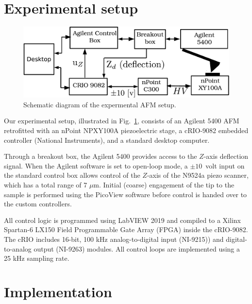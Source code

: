 \documentclass[journal]{IEEEtran}
\begin{document}
\section{Experimental setup} \label{sec:experimentalSetup}
\begin{figure}[ht!]
  \includegraphics[width=1\columnwidth]{figures/exp_setup.pdf}
  \caption{Schematic diagram of the expermental AFM setup.}
  \label{fig:exp_setup}
\end{figure}

Our experimental setup, illustrated in Fig.~\ref{fig:exp_setup},
consists of an Agilent 5400 AFM retrofitted with an nPoint NPXY100A
piezoelectric stage, a cRIO-9082 embedded controller (National
Instruments), and a standard desktop computer.

Through a breakout box, the Agilent 5400 provides access to the
$Z$-axis deflection signal. When the Agilent software is set to
open-loop mode, a $\pm10$~volt input on the standard control box
allows control of the $Z$-axis of the N9524a piezo scanner, which has
a total range of 7 $\mu$m. Initial (coarse) engagement of the tip to
the sample is performed using the PicoView software before control is
handed over to the custom controllers.
	
All control logic is programmed using LabVIEW 2019 and compiled to a
Xilinx Spartan-6 LX150 Field Programmable Gate Array (FPGA) inside the
cRIO-9082. The cRIO includes 16-bit, 100 kHz analog-to-digital input (NI-9215)) and digital-to-analog output (NI-9263) modules.
All control loops are implemented
using a 25 kHz sampling rate.


\section{Implementation}\label{sec:implementation}
\end{document}
